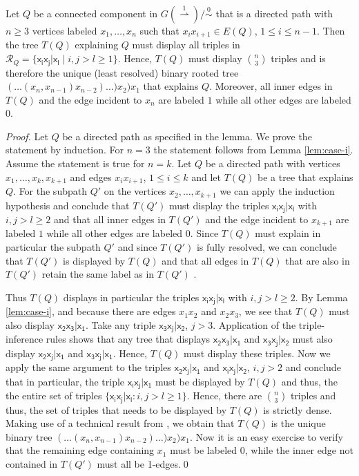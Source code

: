 \documentclass[smallextended]{svjour3}
\let\cite\citep
\newcommand{\Ro}{\mathrel{\overset{0}{\sim}}}
\newcommand{\Rld}{\mathrel{\overset{1}{\rightharpoonup}}}
\newcommand{\rt}[1]{\ensuremath{\mathsf{#1}}}
\begin{document}
\begin{lemma}
  Let $Q$ be a connected component in $G(\Rld)/\Ro$ that is a
  directed path with $n\ge 3$ vertices labeled $x_1,\dots,x_n$ such that
  $x_ix_{i+1}\in E(Q)$, $1\leq i\leq n-1$. 
  Then the tree $T(Q)$ explaining $Q$ must display all triples in $\mathcal
  R_Q = \{\rt{x_ix_j|x_l} \mid i,j>l\geq 1\}$.  Hence, $T(Q)$ must display
  $\binom{n}{3}$ triples and is therefore the unique (least resolved)
  binary rooted tree $(\dots(x_n,x_{n-1})x_{n-2})\dots)x_2)x_1$ that
  explains $Q$.  Moreover, all inner edges in $T(Q)$ and the edge incident
  to $x_n$ are labeled $1$ while all other edges are labeled $0$.
  \label{lem:path-tree}
\end{lemma}
\begin{proof}
  Let $Q$ be a directed path as specified in the lemma. We prove the
  statement by induction. For $n=3$ the statement follows from Lemma
  \ref{lem:case-i}. Assume the statement is true for $n=k$. Let $Q$ be a
  directed path with vertices $x_1,\dots,x_k, x_{k+1}$ and edges
  $x_ix_{i+1}$, $1\leq i\leq k$ and let $T(Q)$ be a tree that explains
  $Q$. For the subpath $Q'$ on the vertices $x_2,\dots,x_{k+1}$ we can
  apply the induction hypothesis and conclude that $T(Q')$ must display the
  triples $\rt{x_ix_j|x_l}$ with $i,j>l\geq 2$ and that all inner edges in
  $T(Q')$ and the edge incident to $x_{k+1}$ are labeled $1$ while all
  other edges are labeled $0$. Since $T(Q)$ must explain in particular the
  subpath $Q'$ and since $T(Q')$ is fully resolved, we can conclude that
  $T(Q')$ is displayed by $T(Q)$ and that all edges in $T(Q)$ that are also
  in $T(Q')$ retain the same label as in $T(Q')$ .
	
  Thus $T(Q)$ displays in particular the triples $\rt{x_ix_j|x_l}$ with
  $i,j>l\geq 2$.  By Lemma \ref{lem:case-i}, and because there are edges
  $x_1x_2$ and $x_2x_3$, we see that $T(Q)$ must also display
  $\rt{x_2x_3|x_1}$.  Take any triple $\rt{x_3x_j|x_2}$, $j>3$.
  Application of the triple-inference rules shows that any tree that
  displays $\rt{x_2x_3|x_1}$ and $\rt{x_3x_j|x_2}$ must also display
  $\rt{x_2x_j|x_1}$ and $\rt{x_3x_j|x_1}$. Hence, $T(Q)$ must display these
  triples.  Now we apply the same argument to the triples $\rt{x_2x_j|x_1}$
  and $\rt{x_ix_j|x_2}$, $i,j>2$ and conclude that in particular, the
  triple $\rt{x_ix_j|x_1}$ must be displayed by $T(Q)$ and thus, the the
  entire set of triples $\{\rt{x_ix_j|x_l} \colon i,j>l\geq 1\}$.  Hence,
  there are $\binom{n}{3}$ triples and thus, the set of triples that needs
  to be displayed by $T(Q)$ is strictly dense. Making use of a technical
  result from \cite[Suppl. Material]{Hellmuth:15a}, we obtain that $T(Q)$
  is the unique binary tree $(\dots(x_n,x_{n-1})x_{n-2})\dots)x_2)x_1$. Now
  it is an easy exercise to verify that the remaining edge containing $x_1$
  must be labeled $0$, while the inner edge not contained in $T(Q')$ must
  all be 1-edges.\qed
\end{proof}
\end{document}

